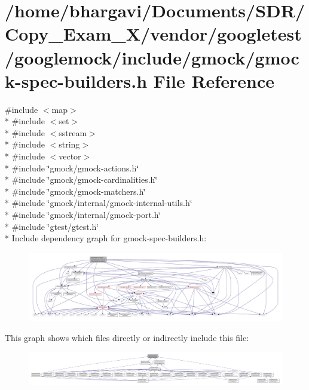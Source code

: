 \hypertarget{gmock-spec-builders_8h}{}\section{/home/bhargavi/\+Documents/\+S\+D\+R/\+Copy\+\_\+\+Exam\+\_\+X/vendor/googletest/googlemock/include/gmock/gmock-\/spec-\/builders.h File Reference}
\label{gmock-spec-builders_8h}
{\ttfamily \#include $<$map$>$}\\*
{\ttfamily \#include $<$set$>$}\\*
{\ttfamily \#include $<$sstream$>$}\\*
{\ttfamily \#include $<$string$>$}\\*
{\ttfamily \#include $<$vector$>$}\\*
{\ttfamily \#include \char`\"{}gmock/gmock-\/actions.\+h\char`\"{}}\\*
{\ttfamily \#include \char`\"{}gmock/gmock-\/cardinalities.\+h\char`\"{}}\\*
{\ttfamily \#include \char`\"{}gmock/gmock-\/matchers.\+h\char`\"{}}\\*
{\ttfamily \#include \char`\"{}gmock/internal/gmock-\/internal-\/utils.\+h\char`\"{}}\\*
{\ttfamily \#include \char`\"{}gmock/internal/gmock-\/port.\+h\char`\"{}}\\*
{\ttfamily \#include \char`\"{}gtest/gtest.\+h\char`\"{}}\\*
Include dependency graph for gmock-\/spec-\/builders.h\+:
\nopagebreak
\begin{figure}[H]
\begin{center}
\leavevmode
\includegraphics[width=350pt]{gmock-spec-builders_8h__incl}
\end{center}
\end{figure}
This graph shows which files directly or indirectly include this file\+:
\nopagebreak
\begin{figure}[H]
\begin{center}
\leavevmode
\includegraphics[width=350pt]{gmock-spec-builders_8h__dep__incl}
\end{center}
\end{figure}
